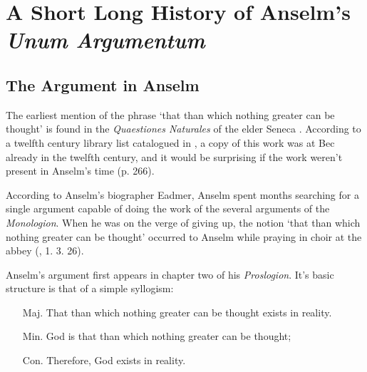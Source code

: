 \documentclass[]{birkjour}
\begin{document}
\section{A Short Long History of Anselm's \textit{Unum Argumentum}}
\subsection{The Argument in Anselm}
The earliest mention of the phrase `that than which nothing greater can be thought' is found in the \textit{Quaestiones Naturales} of the elder Seneca \cite{SenecaQN}. According to a twelfth century library list catalogued in \cite{Bekker1885}, a copy of this work was at Bec already in the twelfth century, and it would be surprising if the work weren't present in Anselm's time (p. 266).
	
According to Anselm's biographer Eadmer, Anselm spent months searching for a single argument capable of doing the work of the several arguments of the \textit{Monologion}. When he was on the verge of giving up, the notion `that than which nothing greater can be thought' occurred to Anselm while praying in choir at the abbey (\cite{VA}, 1. 3. 26).
	
Anselm's argument first appears in chapter two of his \textit{Proslogion}. It's basic structure is that of a simple syllogism:
\begin{enumerate}
\item[Maj.] That than which nothing greater can be thought exists in reality.
\item[Min.] God is that than which nothing greater can be thought;
\item[Con.] Therefore, God exists in reality.
\end{enumerate}
	
\end{document}
